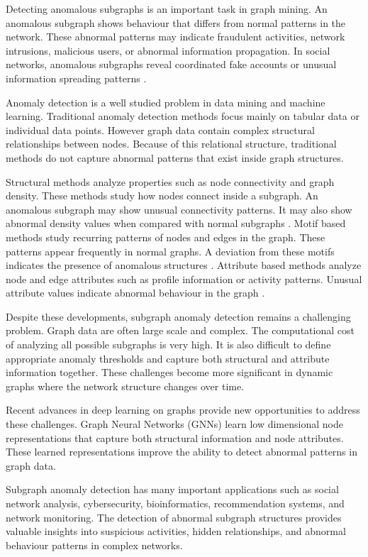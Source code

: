 \documentclass[10pt,twocolumn,a4paper]{article}
\begin{document}
Detecting anomalous subgraphs is an important task in graph mining. An anomalous subgraph shows behaviour that differs from normal patterns in the network. These abnormal patterns may indicate fraudulent activities, network intrusions, malicious users, or abnormal information propagation. In social networks, anomalous subgraphs reveal coordinated fake accounts or unusual information spreading patterns \cite{DANIEL2026389}.

Anomaly detection is a well studied problem in data mining and machine learning. Traditional anomaly detection methods focus mainly on tabular data or individual data points. However graph data contain complex structural relationships between nodes. Because of this relational structure, traditional methods do not capture abnormal patterns that exist inside graph structures.

Structural methods analyze properties such as node connectivity and graph density. These methods study how nodes connect inside a subgraph. An anomalous subgraph may show unusual connectivity patterns. It may also show abnormal density values when compared with normal subgraphs \cite{aggarwal2018anomaly,bollobas2013modern}. Motif based methods study recurring patterns of nodes and edges in the graph. These patterns appear frequently in normal graphs. A deviation from these motifs indicates the presence of anomalous structures \cite{leskovec2007graph}. Attribute based methods analyze node and edge attributes such as profile information or activity patterns. Unusual attribute values indicate abnormal behaviour in the graph \cite{sun2019survey}.

Despite these developments, subgraph anomaly detection remains a challenging problem. Graph data are often large scale and complex. The computational cost of analyzing all possible subgraphs is very high. It is also difficult to define appropriate anomaly thresholds and capture both structural and attribute information together. These challenges become more significant in dynamic graphs where the network structure changes over time.

Recent advances in deep learning on graphs provide new opportunities to address these challenges. Graph Neural Networks (GNNs) learn low dimensional node representations that capture both structural information and node attributes. These learned representations improve the ability to detect abnormal patterns in graph data.

Subgraph anomaly detection has many important applications such as social network analysis, cybersecurity, bioinformatics, recommendation systems, and network monitoring. The detection of abnormal subgraph structures provides valuable insights into suspicious activities, hidden relationships, and abnormal behaviour patterns in complex networks.
\end{document}
